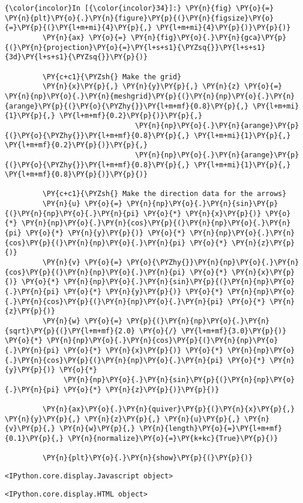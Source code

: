     \begin{Verbatim}[commandchars=\\\{\}]
{\color{incolor}In [{\color{incolor}34}]:} \PY{n}{fig} \PY{o}{=} \PY{n}{plt}\PY{o}{.}\PY{n}{figure}\PY{p}{(}\PY{n}{figsize}\PY{o}{=}\PY{p}{(}\PY{l+m+mi}{4}\PY{p}{,} \PY{l+m+mi}{4}\PY{p}{)}\PY{p}{)}
         \PY{n}{ax} \PY{o}{=} \PY{n}{fig}\PY{o}{.}\PY{n}{gca}\PY{p}{(}\PY{n}{projection}\PY{o}{=}\PY{l+s+s1}{\PYZsq{}}\PY{l+s+s1}{3d}\PY{l+s+s1}{\PYZsq{}}\PY{p}{)}
         
         \PY{c+c1}{\PYZsh{} Make the grid}
         \PY{n}{x}\PY{p}{,} \PY{n}{y}\PY{p}{,} \PY{n}{z} \PY{o}{=} \PY{n}{np}\PY{o}{.}\PY{n}{meshgrid}\PY{p}{(}\PY{n}{np}\PY{o}{.}\PY{n}{arange}\PY{p}{(}\PY{o}{\PYZhy{}}\PY{l+m+mf}{0.8}\PY{p}{,} \PY{l+m+mi}{1}\PY{p}{,} \PY{l+m+mf}{0.2}\PY{p}{)}\PY{p}{,}
                               \PY{n}{np}\PY{o}{.}\PY{n}{arange}\PY{p}{(}\PY{o}{\PYZhy{}}\PY{l+m+mf}{0.8}\PY{p}{,} \PY{l+m+mi}{1}\PY{p}{,} \PY{l+m+mf}{0.2}\PY{p}{)}\PY{p}{,}
                               \PY{n}{np}\PY{o}{.}\PY{n}{arange}\PY{p}{(}\PY{o}{\PYZhy{}}\PY{l+m+mf}{0.8}\PY{p}{,} \PY{l+m+mi}{1}\PY{p}{,} \PY{l+m+mf}{0.8}\PY{p}{)}\PY{p}{)}
         
         \PY{c+c1}{\PYZsh{} Make the direction data for the arrows}
         \PY{n}{u} \PY{o}{=} \PY{n}{np}\PY{o}{.}\PY{n}{sin}\PY{p}{(}\PY{n}{np}\PY{o}{.}\PY{n}{pi} \PY{o}{*} \PY{n}{x}\PY{p}{)} \PY{o}{*} \PY{n}{np}\PY{o}{.}\PY{n}{cos}\PY{p}{(}\PY{n}{np}\PY{o}{.}\PY{n}{pi} \PY{o}{*} \PY{n}{y}\PY{p}{)} \PY{o}{*} \PY{n}{np}\PY{o}{.}\PY{n}{cos}\PY{p}{(}\PY{n}{np}\PY{o}{.}\PY{n}{pi} \PY{o}{*} \PY{n}{z}\PY{p}{)}
         \PY{n}{v} \PY{o}{=} \PY{o}{\PYZhy{}}\PY{n}{np}\PY{o}{.}\PY{n}{cos}\PY{p}{(}\PY{n}{np}\PY{o}{.}\PY{n}{pi} \PY{o}{*} \PY{n}{x}\PY{p}{)} \PY{o}{*} \PY{n}{np}\PY{o}{.}\PY{n}{sin}\PY{p}{(}\PY{n}{np}\PY{o}{.}\PY{n}{pi} \PY{o}{*} \PY{n}{y}\PY{p}{)} \PY{o}{*} \PY{n}{np}\PY{o}{.}\PY{n}{cos}\PY{p}{(}\PY{n}{np}\PY{o}{.}\PY{n}{pi} \PY{o}{*} \PY{n}{z}\PY{p}{)}
         \PY{n}{w} \PY{o}{=} \PY{p}{(}\PY{n}{np}\PY{o}{.}\PY{n}{sqrt}\PY{p}{(}\PY{l+m+mf}{2.0} \PY{o}{/} \PY{l+m+mf}{3.0}\PY{p}{)} \PY{o}{*} \PY{n}{np}\PY{o}{.}\PY{n}{cos}\PY{p}{(}\PY{n}{np}\PY{o}{.}\PY{n}{pi} \PY{o}{*} \PY{n}{x}\PY{p}{)} \PY{o}{*} \PY{n}{np}\PY{o}{.}\PY{n}{cos}\PY{p}{(}\PY{n}{np}\PY{o}{.}\PY{n}{pi} \PY{o}{*} \PY{n}{y}\PY{p}{)} \PY{o}{*}
              \PY{n}{np}\PY{o}{.}\PY{n}{sin}\PY{p}{(}\PY{n}{np}\PY{o}{.}\PY{n}{pi} \PY{o}{*} \PY{n}{z}\PY{p}{)}\PY{p}{)}
         
         \PY{n}{ax}\PY{o}{.}\PY{n}{quiver}\PY{p}{(}\PY{n}{x}\PY{p}{,} \PY{n}{y}\PY{p}{,} \PY{n}{z}\PY{p}{,} \PY{n}{u}\PY{p}{,} \PY{n}{v}\PY{p}{,} \PY{n}{w}\PY{p}{,} \PY{n}{length}\PY{o}{=}\PY{l+m+mf}{0.1}\PY{p}{,} \PY{n}{normalize}\PY{o}{=}\PY{k+kc}{True}\PY{p}{)}
         
         \PY{n}{plt}\PY{o}{.}\PY{n}{show}\PY{p}{(}\PY{p}{)}
\end{Verbatim}


    
    \begin{verbatim}
<IPython.core.display.Javascript object>
    \end{verbatim}

    
    
    \begin{verbatim}
<IPython.core.display.HTML object>
    \end{verbatim}

    

    
    
    
